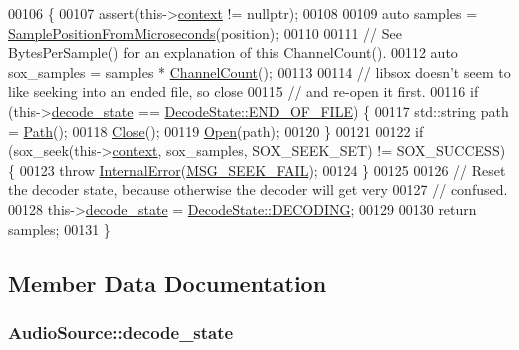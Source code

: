 \begin{DoxyCode}
00106 \{
00107     assert(this->\hyperlink{classAudioSource_a2bbce89d4bef9cf46b1113de3245655a}{context} != \textcolor{keyword}{nullptr});
00108 
00109     \textcolor{keyword}{auto} samples = \hyperlink{classAudioSource_ac0a5d14505c36238d4a8a465122ff06e}{SamplePositionFromMicroseconds}(position);
00110 
00111     \textcolor{comment}{// See BytesPerSample() for an explanation of this ChannelCount().}
00112     \textcolor{keyword}{auto} sox\_samples = samples * \hyperlink{classAudioSource_a267178b39a3a4d2fc86f41f6a96caf03}{ChannelCount}();
00113 
00114     \textcolor{comment}{// libsox doesn't seem to like seeking into an ended file, so close}
00115     \textcolor{comment}{// and re-open it first.}
00116     \textcolor{keywordflow}{if} (this->\hyperlink{classAudioSource_abe3899ebe685335a84c5bfee5a20a96f}{decode\_state} == \hyperlink{classAudioSource_a9a2f5de44325c84e69a7af1331aa159da581953f6b20ad7f993b64b1dc632032e}{DecodeState::END\_OF\_FILE}) \{
00117         std::string path = \hyperlink{classAudioSource_aea5c3828f1b22a9e103a5d56f9ffa5ec}{Path}();
00118         \hyperlink{classAudioSource_a46444de950d02ac35a695ad167fed2f4}{Close}();
00119         \hyperlink{classAudioSource_a9b10234d7c9f29b17008b4dc3eab2a71}{Open}(path);
00120     \}
00121 
00122     \textcolor{keywordflow}{if} (sox\_seek(this->\hyperlink{classAudioSource_a2bbce89d4bef9cf46b1113de3245655a}{context}, sox\_samples, SOX\_SEEK\_SET) != SOX\_SUCCESS) \{
00123         \textcolor{keywordflow}{throw} \hyperlink{classInternalError}{InternalError}(\hyperlink{messages_8h_aed3c894dfba47c4007dc39b38b5d3dbe}{MSG\_SEEK\_FAIL});
00124     \}
00125 
00126     \textcolor{comment}{// Reset the decoder state, because otherwise the decoder will get very}
00127     \textcolor{comment}{// confused.}
00128     this->\hyperlink{classAudioSource_abe3899ebe685335a84c5bfee5a20a96f}{decode\_state} = \hyperlink{classAudioSource_a9a2f5de44325c84e69a7af1331aa159da9b75f3acd3c3480965b0f5ee466e7f25}{DecodeState::DECODING};
00129 
00130     \textcolor{keywordflow}{return} samples;
00131 \}
\end{DoxyCode}


\subsection{Member Data Documentation}
\hypertarget{classAudioSource_abe3899ebe685335a84c5bfee5a20a96f}{
\subsubsection[{decode\+\_\+state}]{ Audio\+Source\+::decode\+\_\+state\hspace{0.3cm}{\ttfamily [private]}}}\label{classAudioSource_abe3899ebe685335a84c5bfee5a20a96f}


